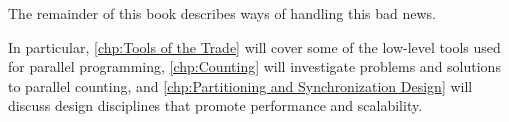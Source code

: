 The remainder of this book describes ways of handling this bad news.

In particular,
\cref{chp:Tools of the Trade} will cover some of the low-level
tools used for parallel programming,
\cref{chp:Counting} will investigate problems and solutions to
parallel counting, and
\cref{chp:Partitioning and Synchronization Design}
will discuss design disciplines that promote performance and scalability.

